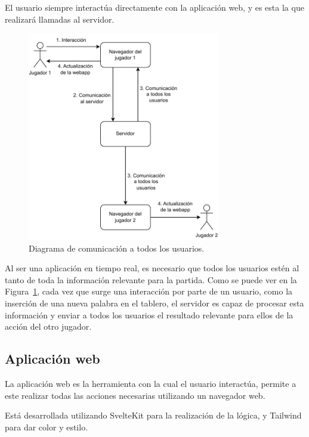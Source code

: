 El usuario siempre interactúa directamente con la aplicación web, y es esta la que realizará llamadas al servidor.

\begin{figure}[H]
	\centering
	\includegraphics[clip=true,width=0.75\textwidth]{./diagrams/overall_communications.pdf}
	\caption{Diagrama de comunicación a todos los usuarios.}
	\label{fig:ex_comms}
\end{figure}

Al ser una aplicación en tiempo real, es necesario que todos los usuarios estén al tanto de toda la información relevante para la partida. Como se puede ver en la Figura~\ref{fig:ex_comms}, cada vez que surge una interacción por parte de un usuario, como la inserción de una nueva palabra en el tablero, el servidor es capaz de procesar esta información y enviar a todos los usuarios el resultado relevante para ellos de la acción del otro jugador.


\subsection{Aplicación web}
La aplicación web es la herramienta con la cual el usuario interactúa, permite a este realizar todas las acciones necesarias utilizando un navegador web.

Está desarrollada utilizando SvelteKit para la realización de la lógica, y Tailwind para dar color y estilo.

